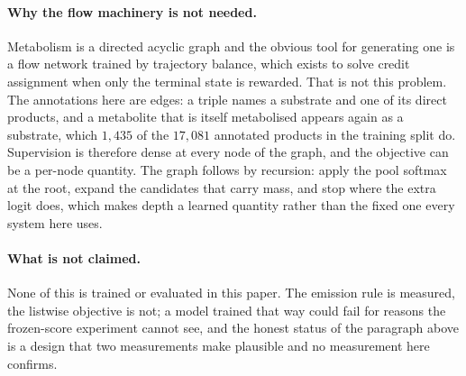 \paragraph{Why the flow machinery is not needed.} Metabolism is a directed acyclic graph and the
obvious tool for generating one is a flow network trained by trajectory balance, which exists to
solve credit assignment when only the terminal state is rewarded. That is not this problem. The
annotations here are edges: a triple names a substrate and one of its direct products, and a
metabolite that is itself metabolised appears again as a substrate, which $1{,}435$ of the
$17{,}081$ annotated products in the training split do. Supervision is therefore dense at every node of the graph,
and the objective can be a per-node quantity. The graph follows by recursion: apply the pool softmax
at the root, expand the candidates that carry mass, and stop where the extra logit does, which makes
depth a learned quantity rather than the fixed one every system here uses.

\paragraph{What is not claimed.} None of this is trained or evaluated in this paper. The emission
rule is measured, the listwise objective is not; a model trained that way could fail for reasons the
frozen-score experiment cannot see, and the honest status of the paragraph above is a design that
two measurements make plausible and no measurement here confirms.
